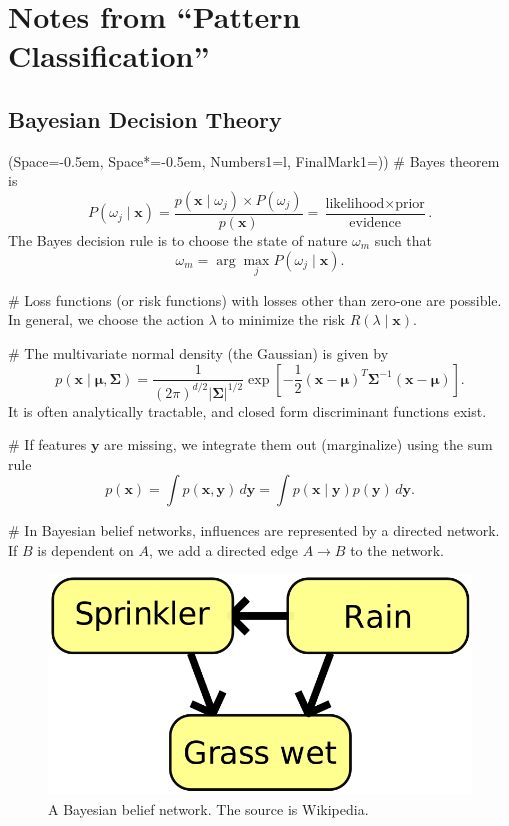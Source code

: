 \documentclass[12pt, a4paper]{article}
\newcommand{\listSpace}{-0.5em}%
\newcommand{\vect}[1]{\bm{#1}}
\newcommand{\abs}[1]{\left\lvert#1\right\rvert}
\begin{document}
\clearpage
\tableofcontents
\clearpage
\section{Notes from ``Pattern Classification''}
\setcounter{subsection}{1}
\subsection{Bayesian Decision Theory}
\begin{easylist}[itemize]
\ListProperties(Space=\listSpace, Space*=\listSpace, Numbers1=l, FinalMark1={)})
# Bayes theorem is
\begin{equation*}
	P(\omega_j \mid \vect{x}) = \frac{p(\vect{x} \mid \omega_j) \times P(\omega_j)}{p(\vect{x})}
	= \frac{\text{likelihood} \times \text{prior}}{\text{evidence}}.
\end{equation*}
The Bayes decision rule is to choose the state of nature $\omega_m$ such that
\begin{equation*}
	\omega_m = \arg \max_j P(\omega_j \mid \vect{x}).
\end{equation*}

# Loss functions (or risk functions) with losses other than zero-one are possible.
 In general, we choose the action $\lambda$ to minimize the risk $R(\lambda \mid \vect{x})$.
 
# The multivariate normal density (the Gaussian) is given by
\begin{equation*}
	p(\vect{x} \mid \vect{\mu}, \vect{\Sigma}) = \frac{1}{(2 \pi)^{d/2} \abs{\vect{\Sigma}}^{1/2}} 
	\exp \left[ - \frac{1}{2} 
	\left( \vect{x} - \vect{\mu} \right)^T \vect{\Sigma}^{-1} 
	\left( \vect{x} - \vect{\mu} \right) \right].
\end{equation*}
It is often analytically tractable, and closed form discriminant functions exist.

# If features $\vect{y}$ are missing, we integrate them out (marginalize) using the sum rule
\begin{equation*}
	p(\vect{x}) = \int p(\vect{x}, \vect{y}) \, d\vect{y} = \int p(\vect{x} \mid \vect{y}) p(\vect{y}) \, d\vect{y}.
\end{equation*}

# In Bayesian belief networks, influences are represented by a directed network.
If $B$ is dependent on $A$, we add a directed edge $A \to B$ to the network.
\end{easylist}
\begin{figure}[ht!]
\centering
\includegraphics[width=0.3\linewidth]{figs/bayesian_belief_network}
\caption{A Bayesian belief network. The source is Wikipedia.}
\label{fig:bayesian_belief_network}
\end{figure}
\end{document}
